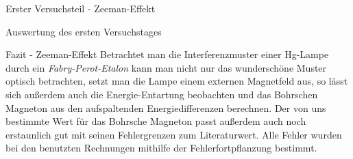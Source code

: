 \documentclass[pdftex, a4paper,11pt, twoside, ngerman]{report}
\begin{document}
\begin{chapter}{Erster Versuchsteil - Zeeman-Effekt}
\begin{section}{Auswertung des ersten Versuchstages}
\begin{subsection}
\begin{subsubsection}
        \end{subsubsection}
        
      \end{subsection}
      
    \end{section}
   
   
   
    \begin{section}{Fazit - Zeeman-Effekt}
      \label{chp:ZeemanEffekt:sec:Fazit}
      Betrachtet man die Interferenzmuster einer Hg-Lampe durch ein
      \textit{Fabry-Perot-Etalon} kann man nicht nur das wunderschöne Muster
      optisch betrachten, setzt man die Lampe einem externen Magnetfeld aus,
      so lässt sich außerdem auch die Energie-Entartung beobachten und das
      Bohrschen Magneton aus den aufspaltenden Energiedifferenzen berechnen.
      Der von uns bestimmte Wert für das Bohrsche Magneton passt außerdem auch
      noch erstaunlich gut mit seinen Fehlergrenzen zum Literaturwert.
      Alle Fehler wurden bei den benutzten Rechnungen mithilfe der
      Fehlerfortpflanzung bestimmt.
    \end{section}
   
  \end{chapter}
 
 
 
\end{document}
